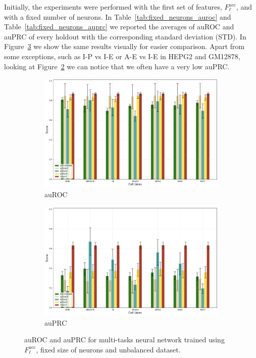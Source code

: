 Initially, the experiments were performed with the first set of features, $F_\ell^{\textrm{acc}}$, and with a fixed number of neurons. In Table~\ref{tab:fixed_neurons_auroc} and Table~\ref{tab:fixed_neurons_auprc} we reported the averages of auROC and auPRC of every holdout with the corresponding standard deviation (STD). In Figure~\ref{fig:fixed_neurons_results} we show the same results visually for easier comparison. Apart from some exceptions, such as I-P vs I-E or A-E vs I-E in HEPG2 and GM12878, looking at Figure~\ref{fig:auprc_fixed_neurons} we can notice that we often have a very low auPRC. 
\begin{figure}[!htbp]
    \centering
    \begin{subfigure}[b]{\textwidth}
        \includegraphics[width=\textwidth]{images/results_plots/fixed_neurons_auroc.png}
        \caption{auROC}
        \label{fig:auroc_fixed_neurons}
    \end{subfigure}
    \begin{subfigure}[b]{\textwidth}
        \includegraphics[width=\textwidth]{images/results_plots/fixed_neurons_auprc.png}
        \caption{auPRC}
        \label{fig:auprc_fixed_neurons}
    \end{subfigure}
    \caption{auROC and auPRC for multi-tasks neural network trained using $F_\ell^{\textrm{acc}}$, fixed size of neurons and unbalanced dataset.}
    \label{fig:fixed_neurons_results}
\end{figure}

